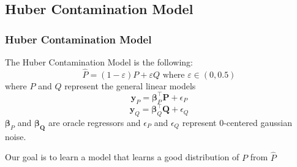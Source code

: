 \documentclass[
11pt, %
serif
]{beamer}
\begin{document}
	
	\subsection{Huber Contamination Model}
	
	\begin{frame}
		\frametitle{Huber Contamination Model}
		
		\begin{Problem}
			The \alert{Huber Contamination Model} is the following:
			\begin{equation*}
				\hat{P} = (1-\varepsilon)P + \varepsilon Q \text{ where } \varepsilon \in (0,0.5)
			\end{equation*}
			where $P$ and $Q$ represent the general linear models
			\begin{equation*}
				\boldsymbol{y}_P = \boldsymbol{\beta}_P^\top \mathbf{P} + \epsilon_P 
			\end{equation*}
			\begin{equation*}
				\boldsymbol{y}_Q = \boldsymbol{\beta}_Q^\top \mathbf{Q} + \epsilon_Q
			\end{equation*}
			$\boldsymbol{\beta}_P$ and $\boldsymbol{\beta_Q}$ are  oracle regressors and $\epsilon_P$ and $\epsilon_Q$ represent $0$-centered gaussian noise. 
		\end{Problem}
		
		Our goal is to learn a model that learns a good distribution of $P$ from $\hat{P}$
		
		\bigskip %
		
	\end{frame}
	
	
\end{document}
